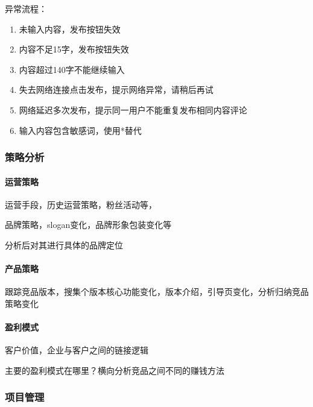 \documentclass[letterpaper,10pt,english]{sphinxmanual}
\begin{document}
异常流程：
\begin{enumerate}
%
\item {} 
未输入内容，发布按钮失效

\item {} 
内容不足15字，发布按钮失效

\item {} 
内容超过140字不能继续输入

\item {} 
失去网络连接点击发布，提示网络异常，请稍后再试

\item {} 
网络延迟多次发布，提示同一用户不能重复发布相同内容评论

\item {} 
输入内容包含敏感词，使用*替代

\end{enumerate}


\subsubsection{策略分析}
\label{\detokenize{chapter_knowledge/strategy_analysis:id1}}\label{\detokenize{chapter_knowledge/strategy_analysis::doc}}

\paragraph{运营策略}
\label{\detokenize{chapter_knowledge/strategy_analysis:id2}}
运营手段，历史运营策略，粉丝活动等，

品牌策略，slogan变化，品牌形象包装变化等

分析后对其进行具体的品牌定位


\paragraph{产品策略}
\label{\detokenize{chapter_knowledge/strategy_analysis:id3}}
跟踪竞品版本，搜集个版本核心功能变化，版本介绍，引导页变化，分析归纳竞品策略变化


\paragraph{盈利模式}
\label{\detokenize{chapter_knowledge/strategy_analysis:id4}}
客户价值，企业与客户之间的链接逻辑

主要的盈利模式在哪里？横向分析竞品之间不同的赚钱方法


\subsubsection{项目管理}
\label{\detokenize{chapter_knowledge/project_manage:id1}}\label{\detokenize{chapter_knowledge/project_manage::doc}}
\end{document}
